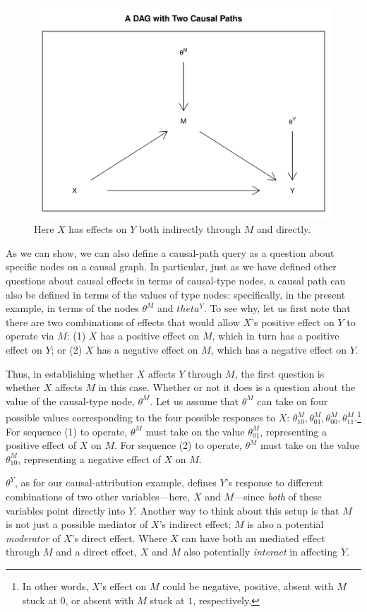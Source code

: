 \documentclass[
  12pt,
]{book}
\begin{document}
\begin{figure}

{\centering \includegraphics[width=.5\textwidth]{ii_files/figure-latex/DAGpaths-1} 

}

\caption{\label{fig:DAGpaths} Here $X$ has effects on $Y$ both indirectly through $M$ and directly.}\label{fig:DAGpaths}
\end{figure}

As we can show, we can also define a causal-path query as a question about specific nodes on a causal graph. In particular, just as we have defined other questions about causal effects in terms of causal-type nodes, a causal path can also be defined in terms of the values of type nodes: specifically, in the present example, in terms of the nodes \(\theta^M\) and \(theta^Y\). To see why, let us first note that there are two combinations of effects that would allow \(X\)'s positive effect on \(Y\) to operate via \(M\): (1) \(X\) has a positive effect on \(M\), which in turn has a positive effect on \(Y\); or (2) \(X\) has a negative effect on \(M\), which has a negative effect on \(Y\).

Thus, in establishing whether \(X\) affects \(Y\) through \(M\), the first question is whether \(X\) affects \(M\) in this case. Whether or not it does is a question about the value of the causal-type node, \(\theta^M\). Let us assume that \(\theta^M\) can take on four possible values corresponding to the four possible responses to \(X\): \(\theta^M_{10}, \theta^M_{01}, \theta^M_{00}, \theta^M_{11}\).\footnote{In other words, \(X\)'s effect on \(M\) could be negative, positive, absent with \(M\) stuck at \(0\), or absent with \(M\) stuck at \(1\), respectively.} For sequence (1) to operate, \(\theta^M\) must take on the value \(\theta^M_{01}\), representing a positive effect of \(X\) on \(M\). For sequence (2) to operate, \(\theta^M\) must take on the value \(\theta^M_{10}\), representing a negative effect of \(X\) on \(M\).

\(\theta^Y\), as for our causal-attribution example, defines \(Y\)'s response to different combinations of two other variables---here, \(X\) and \(M\)---since \emph{both} of these variables point directly into \(Y\). Another way to think about this setup is that \(M\) is not just a possible mediator of \(X\)'s indirect effect; \(M\) is also a potential \emph{moderator} of \(X\)'s direct effect. Where \(X\) can have both an mediated effect through \(M\) and a direct effect, \(X\) and \(M\) also potentially \emph{interact} in affecting \(Y\).
\end{document}

